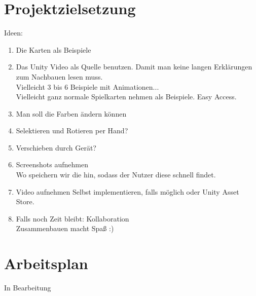 \documentclass[12pt,a4paper, oneside]{scrartcl}
\begin{document}



\newpage




\section{Projektzielsetzung}
Ideen: \\
%
\begin{enumerate}

\item Die Karten als Beispiele 
\item Das Unity Video als Quelle benutzen. Damit man keine langen Erklärungen zum Nachbauen lesen muss. \\
Vielleicht 3 bis 6 Beispiele mit Animationen... \\
Vielleicht ganz normale Spielkarten nehmen als Beispiele. Easy Access.
\item Man soll die Farben ändern können 
\item Selektieren und Rotieren per Hand? 
\item Verschieben durch Gerät? 
\item Screenshots aufnehmen \\
Wo speichern wir die hin, sodass der Nutzer diese schnell findet.
\item Video aufnehmen 
Selbst implementieren, falls möglich oder Unity Asset Store.
\item Falls noch Zeit bleibt: Kollaboration \\
Zusammenbauen macht Spaß :)

\end{enumerate}
	
	






\newpage




\section{Arbeitsplan}
	In Bearbeitung





\newpage





\end{document}
